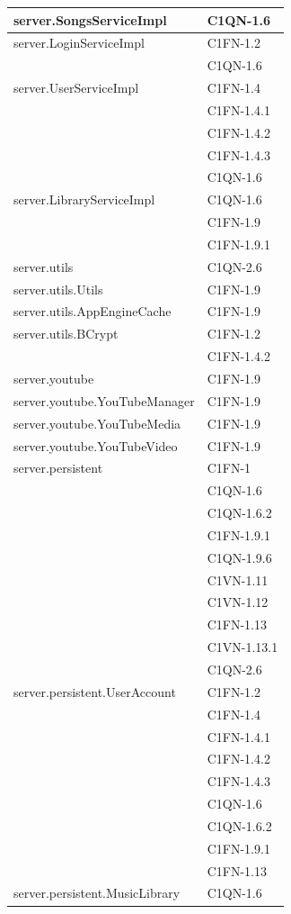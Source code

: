 \begin{footnotesize}
\begin{longtable}[!h]{|l|l|}
server.SongsServiceImpl  &  C1QN-1.6\\\hline 
server.LoginServiceImpl  &  C1FN-1.2\\
& C1QN-1.6\\\hline 
server.UserServiceImpl  &  C1FN-1.4\\
& C1FN-1.4.1\\
& C1FN-1.4.2\\
& C1FN-1.4.3\\
& C1QN-1.6\\\hline 
server.LibraryServiceImpl  &  C1QN-1.6 \\
& C1FN-1.9\\
& C1FN-1.9.1\\\hline 
server.utils  &  C1QN-2.6 \\\hline  
server.utils.Utils  & C1FN-1.9\\\hline  
server.utils.AppEngineCache  &  C1FN-1.9\\\hline
server.utils.BCrypt  &  C1FN-1.2 \\
& C1FN-1.4.2\\\hline
server.youtube  &  C1FN-1.9\\\hline
server.youtube.YouTubeManager  &  C1FN-1.9 \\\hline
server.youtube.YouTubeMedia  &  C1FN-1.9 \\\hline
server.youtube.YouTubeVideo  &  C1FN-1.9 \\\hline
server.persistent  &  C1FN-1 \\
& C1QN-1.6\\
& C1QN-1.6.2\\
& C1FN-1.9.1\\
& C1QN-1.9.6\\
& C1VN-1.11\\
& C1VN-1.12\\
& C1FN-1.13\\
& C1VN-1.13.1\\
& C1QN-2.6\\\hline 
server.persistent.UserAccount  &  C1FN-1.2\\
& C1FN-1.4\\
& C1FN-1.4.1\\
& C1FN-1.4.2\\
& C1FN-1.4.3\\
& C1QN-1.6\\
& C1QN-1.6.2\\ 
& C1FN-1.9.1\\
& C1FN-1.13\\\hline 
server.persistent.MusicLibrary  & C1QN-1.6\\

\end{longtable}
\end{footnotesize}

